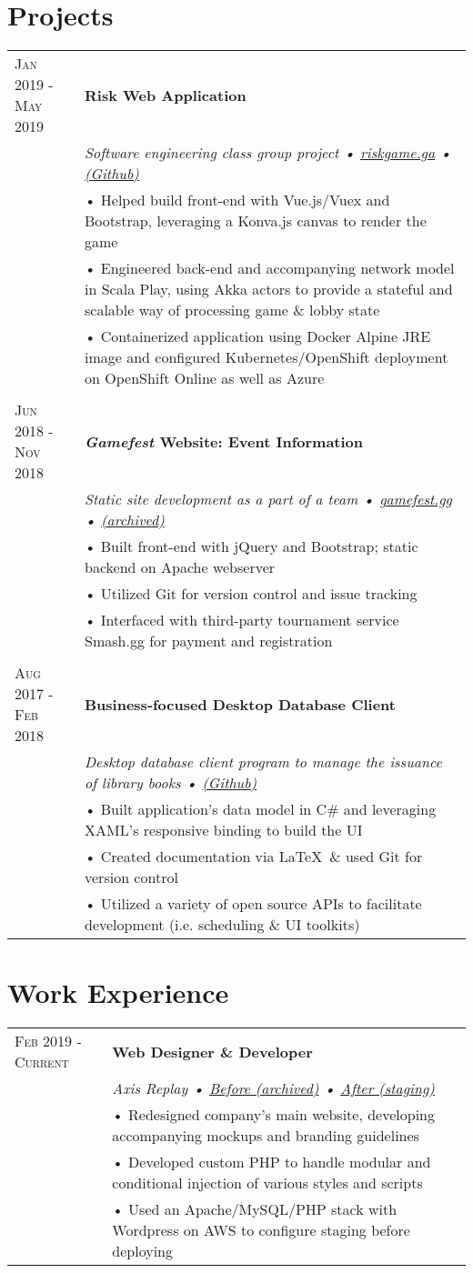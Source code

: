 \documentclass[a4paper,11pt]{article}
\newenvironment{rsection}[1]
  {
    \section{#1}
    \begin{tabular}{>{\raggedleft\arraybackslash}p{3.7cm}|p{14.7cm}}
   } {
    \end{tabular}
  }
\newcommand{\rheader}[2]{
  \textsc{#1} & \textbf{#2}
}
\newcommand{\rdesc}[1]{
  \\&\small{\emph{#1}\vspace{2pt} }
}
\newcommand{\ritem}[2][ • ]{\\[-2pt]& \footnotesize{#1#2}}
\newcommand{\rskip}{\\\multicolumn{2}{c}{} \\}
\begin{document}
\begin{rsection}{Projects}
  \rheader{Jan 2019 - May 2019}{Risk Web Application}
  \rdesc{Software engineering class group project {\normalfont • \href{https://riskgame.ga/}{riskgame.ga} •
\href{https://github.com/jazevedo620/cs2340-risk}{(Github)}}}
  \ritem{Helped build front-end with Vue.js/Vuex and Bootstrap, leveraging a Konva.js canvas to render the game}
  \ritem{Engineered back-end and accompanying network model in Scala Play, using Akka actors to provide a stateful
and scalable way of processing game \& lobby state}
  \ritem{Containerized application using Docker Alpine JRE image and configured Kubernetes/OpenShift deployment on
OpenShift Online as well as Azure}
  \rskip

  \rheader{Jun 2018 - Nov 2018}{\textit{Gamefest} Website: Event Information}
  \rdesc{Static site development as a part of a team {\normalfont • \href{https://gamefest.gg}{gamefest.gg} •
\href{https://web.archive.org/web/20181029052602im_/https://gamefest.gg/}{(archived)}}}
  \ritem{Built front-end with jQuery and Bootstrap; static backend on Apache webserver}
  \ritem{Utilized Git for version control and issue tracking}
  \ritem{Interfaced with third-party tournament service Smash.gg for payment and registration}
  \rskip

  \rheader{Aug 2017 - Feb 2018}{Business-focused Desktop Database Client}
  \rdesc{Desktop database client program to manage the issuance of library books {\normalfont •
\href{https://github.com/jazevedo620/LibraryManager}{(Github)}}}
  \ritem{Built application's data model in C\# and leveraging XAML's responsive binding to build the UI}
  \ritem{Created documentation via \LaTeX\ \& used Git for version control}
  \ritem{Utilized a variety of open source APIs to facilitate development (i.e. scheduling \& UI toolkits)}
\end{rsection}
\vspace{-6pt}

\begin{rsection}{Work Experience}
  \rheader{Feb 2019 - Current}{Web Designer \& Developer}
  \rdesc{Axis Replay {\normalfont •
\href{https://web.archive.org/web/20190412204444_/https://www.axisreplay.com/}{Before (archived)} •
\href{http://axr.gg}{After (staging)}}}
  \ritem{Redesigned company's main website, developing accompanying mockups and branding guidelines}
  \ritem{Developed custom PHP to handle modular and conditional injection of various styles and scripts}
  \ritem{Used an Apache/MySQL/PHP stack with Wordpress on AWS to configure staging before deploying}
\end{rsection}
\end{document}
